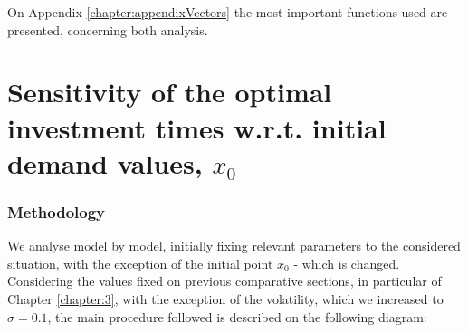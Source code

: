 On Appendix \ref{chapter:appendixVectors} the most important functions used are presented, concerning both analysis.

\section{Sensitivity of the optimal investment times w.r.t. initial demand values, $x_0$}
\label{section:x0}

\subsubsection{Methodology}


We analyse model by model, initially fixing relevant parameters to the considered situation, with the exception of the initial point $x_0$ - which is changed.
Considering the values fixed on previous comparative sections, in particular of Chapter \ref{chapter:3}, with the exception of the volatility, which we increased to $\sigma=0.1$, the main procedure followed is described on the following diagram:

